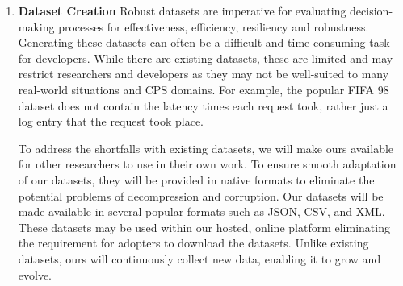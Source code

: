 \documentclass[11pt]{proposalnsf}
\newlength\q %
\begin{document}
\begin{sloppypar}
\begin{enumerate}[noitemsep]
    
    \item \textbf{Dataset Creation} Robust datasets are imperative for evaluating decision-making processes for effectiveness, efficiency, resiliency and robustness. Generating these datasets can often be a difficult and time-consuming task for developers. While there are existing datasets, these are limited and may restrict researchers and developers as they may not be well-suited to many real-world situations and CPS domains. For example, the popular FIFA 98~\cite{ita.ee.lbl.gov_URL} dataset does not contain the latency times each request took, rather just a log entry that the request took place. 
    
To address the shortfalls with existing datasets, we will make ours available for other researchers to use in their own work. To ensure smooth adaptation of our datasets, they will be provided in native formats to eliminate the potential problems of decompression and corruption. Our datasets will be made available in several popular formats such as JSON, CSV, and XML. These datasets may be used within our hosted, online platform eliminating the requirement for adopters to download the datasets. Unlike existing datasets, ours will continuously collect new data, enabling it to grow and evolve.







    

\end{enumerate}
\end{sloppypar}
\end{document}
